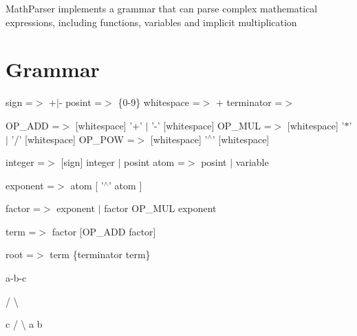 Math\-Parser implements a grammar that can parse complex mathematical expressions, including functions, variables and implicit multiplication

\section*{Grammar}

sign =$>$ +$\vert$-\/ posint =$>$ \{0-\/9\} whitespace =$>$ + terminator =$>$ \par
 O\-P\-\_\-\-A\-D\-D =$>$ \mbox{[}whitespace\mbox{]} '+' $\vert$ '-\/' \mbox{[}whitespace\mbox{]} O\-P\-\_\-\-M\-U\-L =$>$ \mbox{[}whitespace\mbox{]} '$\ast$' $\vert$ '/' \mbox{[}whitespace\mbox{]} O\-P\-\_\-\-P\-O\-W =$>$ \mbox{[}whitespace\mbox{]} '$^\wedge$' \mbox{[}whitespace\mbox{]}

integer =$>$ \mbox{[}sign\mbox{]} integer $\vert$ posint atom =$>$ posint $\vert$ variable

exponent =$>$ atom \mbox{[} '$^\wedge$' atom \mbox{]}

factor =$>$ exponent $\vert$ factor O\-P\-\_\-\-M\-U\-L exponent

term =$>$ factor \mbox{[}O\-P\-\_\-\-A\-D\-D factor\mbox{]}

root =$>$ term \{terminator term\}

a-\/b-\/c


\begin{DoxyItemize}
\item / \textbackslash{}
\end{DoxyItemize}

c / \textbackslash{} a b 